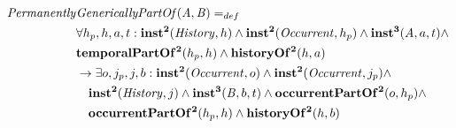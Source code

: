 \begin{equation}
\begin{split}
\mathit{Permanently} & \mathit{GenericallyPartOf}(\mathit{A},\mathit{B})  =_{def}  \\
& \forall h_p, h, a, t:
\mathrm{\mathbf{inst^2}}(\mathit{History}, h) \wedge \mathrm{\mathbf{inst^2}}(\mathit{Occurrent},h_p) \wedge \mathrm{\mathbf{inst^3}}(\mathit{A}, a, t) \wedge  \\
& \mathrm{\mathbf{temporalPartOf^2}}(h_p, h) \wedge 
\mathrm{\mathbf{historyOf^2}}(h, a)  \\ 
& \rightarrow 
\exists o, j_p, j, b:
\mathrm{\mathbf{inst^2}}(\mathit{Occurrent}, o) \wedge 
\mathrm{\mathbf{inst^2}}(\mathit{Occurrent}, j_p) \wedge \\ 
& \quad \mathrm{\mathbf{inst^2}}(\mathit{History},j) \wedge 
 \mathrm{\mathbf{inst^3}}(\mathit{B}, b, t) \wedge  
\mathrm{\mathbf{occurrentPartOf^2}}(o, h_p) \wedge \\
& \quad \mathrm{\mathbf{occurrentPartOf^2}}(h_p, h) \wedge
\mathrm{\mathbf{historyOf^2}}(h, b)
\end{split}
\label{eq:history:PartOf}
\end{equation}


%
%
%
%

%
%


